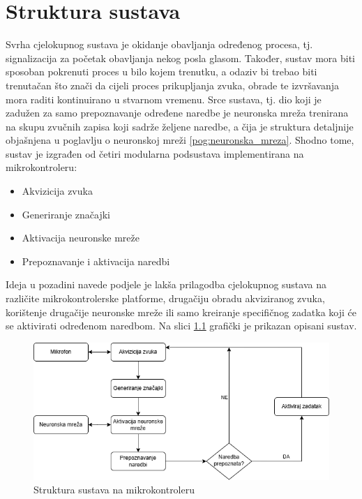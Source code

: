 \chapter{Struktura sustava}
\label{pog:struktura_sustava}

Svrha cjelokupnog sustava je okidanje obavljanja određenog procesa, tj. signalizacija
za početak obavljanja nekog posla glasom. Također, sustav mora biti sposoban pokrenuti
proces u bilo kojem trenutku, a odaziv bi trebao biti trenutačan što
znači da cijeli proces prikupljanja zvuka, obrade te izvršavanja mora raditi
kontinuirano u stvarnom vremenu. Srce sustava, tj. dio koji je zadužen za
samo prepoznavanje određene naredbe je neuronska
mreža trenirana na skupu zvučnih zapisa koji sadrže željene naredbe, a čija je struktura
detaljnije objašnjena u poglavlju o neuronskoj mreži \ref{pog:neuronska_mreza}.
Shodno tome, sustav je izgrađen od četiri modularna
podsustava implementirana na mikrokontroleru:

\begin{itemize}
    \item Akvizicija zvuka
    \item Generiranje značajki
    \item Aktivacija neuronske mreže
    \item Prepoznavanje i aktivacija naredbi
\end{itemize}

Ideja u pozadini navede podjele je lakša prilagodba cjelokupnog
sustava na različite mikrokontrolerske platforme, drugačiju obradu
akviziranog zvuka, korištenje drugačije neuronske mreže ili samo 
kreiranje specifičnog zadatka koji će se aktivirati određenom naredbom.
Na slici \ref{pic:struktura_sustava} grafički je prikazan opisani sustav.

\begin{figure}[htb]
    \centering
    \includegraphics[width=1\linewidth]{Chapters/struktura_sustava/struktura_sustava.png} 
    \caption{Struktura sustava na mikrokontroleru\cite{flowchart}}
    \label{pic:struktura_sustava}
\end{figure}







